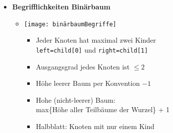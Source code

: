 \begin{itemize}
            \item \textbf{Begrifflichkeiten Binärbaum}
                \begin{itemize}
                    \item[]
                        \begin{minipage}[t]{0.45\textwidth}
                            \texttt{[image: binärbaumBegriffe]}
                        \end{minipage}
                        \begin{minipage}[t]{0.45\textwidth}
                            \vspace{-4.5cm}
                            \begin{itemize}
                                \item Jeder Knoten hat maximal zwei Kinder \\
                                        \texttt{left=child[0]} und \texttt{right=child[1]}
                                \item Ausgangsgrad jedes Knoten ist $\leq 2$
                                \item Höhe leerer Baum per Konvention $-1$
                                \item Hohe (nicht-leerer) Baum: \\
                                        max\{Höhe aller Teilbäume der Wurzel\} + 1
                                \item Halbblatt: Knoten mit nur einem Kind
                            \end{itemize}
                        \end{minipage}
                \end{itemize}

\pagebreak


\end{itemize}
